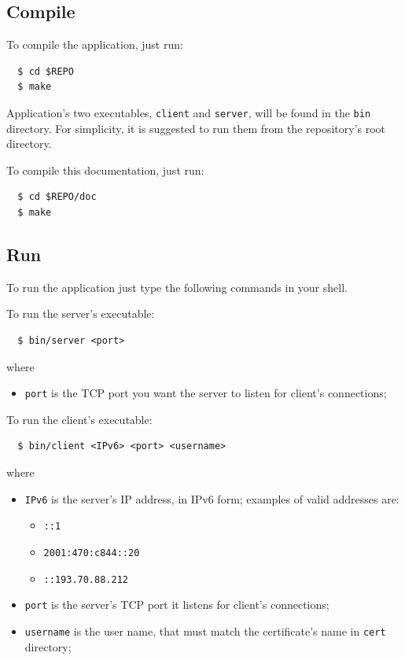 \documentclass[a4paper,12pt]{article}
\begin{document}
\subsection{Compile}
To compile the application, just run:
\begin{verbatim}
  $ cd $REPO
  $ make
\end{verbatim}

Application's two executables, \texttt{client} and \texttt{server}, will be found in the \texttt{bin} directory.
For simplicity, it is suggested to run them from the repository's root directory.

To compile this documentation, just run:
\begin{verbatim}
  $ cd $REPO/doc
  $ make
\end{verbatim}

\subsection{Run}
To run the application just type the following commands in your shell.

To run the server's executable:
\begin{verbatim}
  $ bin/server <port>
\end{verbatim}
where
\begin{itemize}
  \item \texttt{port} is the TCP port you want the server to listen for client's connections;
\end{itemize}

To run the client's executable:
\begin{verbatim}
  $ bin/client <IPv6> <port> <username>
\end{verbatim}
where
\begin{itemize}
  \item \texttt{IPv6} is the server's IP address, in IPv6 form; examples of valid addresses are:
  \begin{itemize}
    \item \texttt{::1}
    \item \texttt{2001:470:c844::20}
    \item \texttt{::193.70.88.212}
  \end{itemize}
  \item \texttt{port} is the server's TCP port it listens for client's connections;
  \item \texttt{username} is the user name, that must match the certificate's name in \texttt{cert} directory;
\end{itemize}
\end{document}
